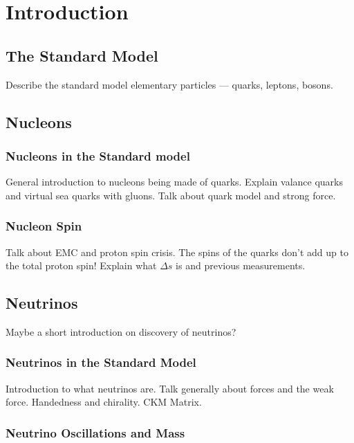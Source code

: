 \section{Introduction} \label{intro}
\hspace{\parindent}

\subsection{The Standard Model}
  Describe the standard model elementary particles --- quarks, leptons, bosons.

\subsection{Nucleons}\label{nucleonintro}
  \subsubsection{Nucleons in the Standard model}
  General introduction to nucleons being made of quarks. Explain valance quarks
  and virtual sea quarks with gluons.  Talk about quark model and strong force.
  \subsubsection{Nucleon Spin}
  Talk about EMC and proton spin crisis. The spins of the quarks don't add up
  to the total proton spin! Explain what $\Delta s$ is and previous
  measurements.

\subsection{Neutrinos}\label{neutrinointro}
  Maybe a short introduction on discovery of neutrinos?
  \subsubsection{Neutrinos in the Standard Model}
    Introduction to what neutrinos are. Talk generally about forces and the
    weak force.  Handedness and chirality. CKM Matrix.
  \subsubsection{Neutrino Oscillations and Mass}

